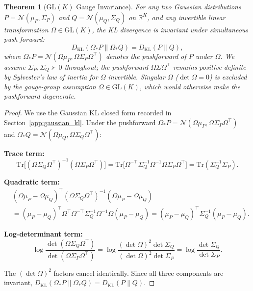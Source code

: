 \documentclass[11pt]{article}
\newtheorem{theorem}{Theorem}
\begin{document}
\begin{theorem}[$\mathrm{GL}(K)$ Gauge Invariance]
\label{thm:glk_invariance}
For any two Gaussian distributions $P = \mathcal{N}(\mu_P, \Sigma_P)$ and $Q = \mathcal{N}(\mu_Q, \Sigma_Q)$ on $\mathbb{R}^K$, and any invertible linear transformation $\Omega \in \mathrm{GL}(K)$, the KL divergence is invariant under simultaneous push-forward:
\begin{equation}
D_{\mathrm{KL}}(\Omega_* P \| \Omega_* Q) = D_{\mathrm{KL}}(P \| Q),
\label{eq:glk_invariance}
\end{equation}
where $\Omega_* P = \mathcal{N}(\Omega\mu_P, \Omega\Sigma_P\Omega^\top)$ denotes the pushforward of $P$ under $\Omega$. We assume $\Sigma_P, \Sigma_Q \succ 0$ throughout; the pushforward $\Omega\Sigma\Omega^\top$ remains positive-definite by Sylvester's law of inertia for $\Omega$ invertible. Singular $\Omega$ ($\det\Omega = 0$) is excluded by the gauge-group assumption $\Omega \in \mathrm{GL}(K)$, which would otherwise make the pushforward degenerate.
\end{theorem}

\begin{proof}
We use the Gaussian KL closed form recorded in Section~\ref{app:gaussian_kl}. Under the pushforward $\Omega_* P = \mathcal{N}(\Omega\mu_P, \Omega\Sigma_P\Omega^\top)$ and $\Omega_* Q = \mathcal{N}(\Omega\mu_Q, \Omega\Sigma_Q\Omega^\top)$:

\textbf{Trace term:}
\begin{equation}
\mathrm{Tr}\big[(\Omega\Sigma_Q\Omega^\top)^{-1}(\Omega\Sigma_P\Omega^\top)\big] = \mathrm{Tr}\big[\Omega^{-\top}\Sigma_Q^{-1}\Omega^{-1}\Omega\Sigma_P\Omega^\top\big] = \mathrm{Tr}(\Sigma_Q^{-1}\Sigma_P).
\end{equation}

\textbf{Quadratic term:}
\begin{align}
&(\Omega\mu_P - \Omega\mu_Q)^\top (\Omega\Sigma_Q\Omega^\top)^{-1} (\Omega\mu_P - \Omega\mu_Q) \nonumber\\
&= (\mu_P - \mu_Q)^\top \Omega^\top \Omega^{-\top}\Sigma_Q^{-1}\Omega^{-1}\Omega (\mu_P - \mu_Q) = (\mu_P - \mu_Q)^\top \Sigma_Q^{-1}(\mu_P - \mu_Q).
\end{align}

\textbf{Log-determinant term:}
\begin{equation}
\log\frac{\det(\Omega\Sigma_Q\Omega^\top)}{\det(\Omega\Sigma_P\Omega^\top)} = \log\frac{(\det\Omega)^2 \det\Sigma_Q}{(\det\Omega)^2 \det\Sigma_P} = \log\frac{\det\Sigma_Q}{\det\Sigma_P}.
\end{equation}

The $(\det\Omega)^2$ factors cancel identically. Since all three components are invariant, $D_{\mathrm{KL}}(\Omega_* P \| \Omega_* Q) = D_{\mathrm{KL}}(P \| Q)$.
\end{proof}
\end{document}
